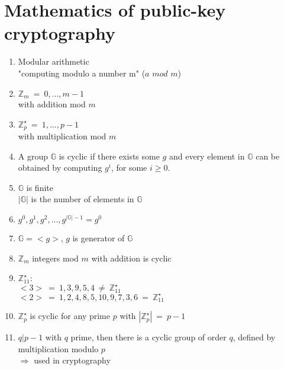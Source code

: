 \documentclass{report}
\begin{document}
\section{Mathematics of public-key cryptography}
\begin{adjustwidth}{2em}{2em}
	\begin{enumerate}[-]
		\item Modular arithmetic \\
		"computing modulo a number m" ($a \textit{ mod } m$)
		\item $\mathbb{Z}_m \ = \ {0, ..., m-1}$ \\
		with addition mod $m$
		\item $\mathbb{Z}_p^{\star} \ = \ {1, ..., p-1}$ \\
		with multiplication mod $m$
		\item A group $\mathbb{G}$ is cyclic if there exists some $g$ and every element in $\mathbb{G}$ can be obtained by computing $g^i$, for some $i \geq 0$.
		\item $\mathbb{G}$ is finite \\
		$|\mathbb{G}|$ is the number of elements in $\mathbb{G}$
		\item $g^0, g^1, g^2, ..., g^{|\mathbb{G}| -1} = g^0$
		\item $\mathbb{G} = <g>$, $g$ is generator of $\mathbb{G}$
		\item $\mathbb{Z}_m$ integers mod $m$ with addition is cyclic
		\item $\mathbb{Z}_{11}^{\star}$: \\
		$<3> \ = \ {1,3,9,5,4} \ \neq \ \mathbb{Z}_{11}^{\star}$ \\
		$<2> \ = \ {1,2,4,8,5,10,9,7,3,6} \ = \ \mathbb{Z}_{11}^{\star}$
		\item $\mathbb{Z}_p^{\star}$ is cyclic for any prime $p$ with $|\mathbb{Z}_p^{\star}| \ = \ p-1$
		\item $q|p-1$ with $q$ prime, then there is a cyclic group of order $q$, defined by multiplication modulo $p$ \\
		$\Rightarrow$ used in cryptography
	\end{enumerate}
\end{adjustwidth}
\end{document}
